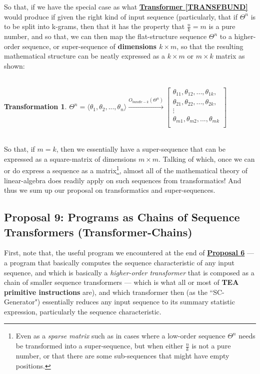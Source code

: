 \documentclass[12pt,a4paper]{article}
\newtheorem{trans}{Transformation}
\begin{document}
So that, if we have the special case as what \textbf{\hyperref[TRANSFBUND]{Transformer \ref{TRANSFBUND}}} would produce if given the right kind of input sequence (particularly, that if $\Theta^n$ is to be split into k-grams, then that it has the property that $\frac{n}{k} = m$ is a pure number, and so that, we can then map the flat-structure sequence $\Theta^n$ to a higher-order sequence, or super-sequence of \textbf{dimensions $k \times m$}, so that the resulting mathematical structure can be neatly expressed as a  $k \times m$ or $m \times k$ matrix as shown:\\\\


\begin{trans}
$\Theta^n = \langle \theta_1, \theta_2, ..., \theta_n \rangle \xrightarrow{O_{bundle-k}(\Theta^n)}
 \begin{bmatrix}
 \theta_{11}, \theta_{12} ,..., \theta_{1k},\\
   \theta_{21}, \theta_{22} ,... , \theta_{2k},\\
   \vdots \\
     \theta_{m1}, \theta_{m2} ,..., \theta_{mk}\\
 \end{bmatrix}$\\\\
\end{trans}

So that, if $m=k$, then we essentially have a super-sequence that can be expressed as a square-matrix of dimensions $m \times m$. Talking of which, once we can or do express a sequence as a matrix\footnote{Even as a \textit{sparse matrix} such as in cases where a low-order sequence $\Theta^n$ needs be transformed into a super-sequence, but when either $\frac{n}{k}$ is not a pure number, or that there are some sub-sequences that might have empty positions.}, almost all of the mathematical theory of linear-algebra does readily apply on such sequences from transformatics! And thus we sum up our proposal on transformatics and super-sequences.

\subsection{Proposal 9: Programs as Chains of Sequence Transformers (Transformer-Chains)\cite{lutalo_2025_trans_genetics}\cite{cli_tttt}}
\label{PROP9}

First, note that, the useful program we encountered at the end of \textbf{\hyperref[PROP6]{Proposal 6}} --- a program that basically computes the sequence characteristic of any input sequence, and which is basically a \textit{higher-order transformer} that is composed as a chain of smaller sequence transformers  --- which is what all or most of \textbf{TEA primitive instructions}\cite{Lutalo2024TEATAZ} are), and which transformer then (as the ``SC-Generator") essentially reduces any input sequence to its summary statistic expression, particularly the sequence characteristic.
\end{document}
